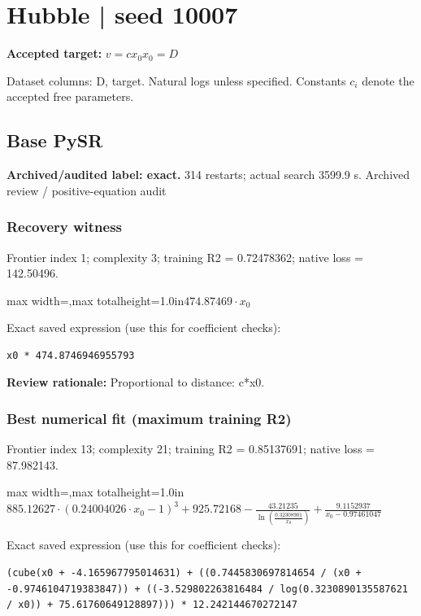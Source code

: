 \documentclass[10pt,letterpaper,landscape]{article}
\begin{document}
\section*{Hubble | seed 10007}
\textbf{Accepted target:} $\displaystyle v=c x_0$\hfill $x_0=D$\par
{\small Dataset columns: D, target. Natural logs unless specified. Constants $c_i$ denote the accepted free parameters.}\par\medskip
\begin{minipage}[t]{0.485\textwidth}
\subsection*{Base PySR}
\textbf{Archived/audited label: exact.} 314 restarts; actual search 3599.9 s.
{\small Archived review / positive-equation audit}
\subsubsection*{Recovery witness}
Frontier index 1; complexity 3; training R2 = 0.72478362; native loss = 142.50496.
\begin{center}\begin{adjustbox}{max width=\linewidth,max totalheight=1.0in}$\displaystyle 474.87469 \cdot x_{0}$\end{adjustbox}\end{center}
{\scriptsize Exact saved expression (use this for coefficient checks):}
\begin{lstlisting}
x0 * 474.8746946955793
\end{lstlisting}
{\small\textbf{Review rationale:} Proportional to distance: c*x0.}
\subsubsection*{Best numerical fit (maximum training R2)}
Frontier index 13; complexity 21; training R2 = 0.85137691; native loss = 87.982143.
\begin{center}\begin{adjustbox}{max width=\linewidth,max totalheight=1.0in}$\displaystyle 885.12627 \cdot \left(0.24004026 \cdot x_{0} - 1\right)^{3} + 925.72168 - \frac{43.21235}{\ln{\left(\frac{0.32308901}{x_{0}} \right)}} + \frac{9.1152937}{x_{0} - 0.97461047}$\end{adjustbox}\end{center}
{\scriptsize Exact saved expression (use this for coefficient checks):}
\begin{lstlisting}
(cube(x0 + -4.165967795014631) + ((0.7445830697814654 / (x0 + -0.9746104719383847)) + ((-3.529802263816484 / log(0.3230890135587621 / x0)) + 75.61760649128897))) * 12.242144670272147
\end{lstlisting}
\end{minipage}\hfill
\end{document}
